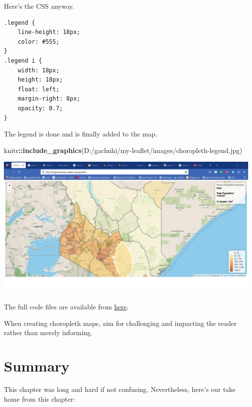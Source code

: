 \documentclass[
]{book}
\newenvironment{Shaded}{\begin{snugshade}}{\end{snugshade}}
\newcommand{\FunctionTok}[1]{\textcolor[rgb]{0.13,0.29,0.53}{\textbf{#1}}}
\newcommand{\NormalTok}[1]{#1}
\newcommand{\SpecialCharTok}[1]{\textcolor[rgb]{0.81,0.36,0.00}{\textbf{#1}}}
\newcommand{\StringTok}[1]{\textcolor[rgb]{0.31,0.60,0.02}{#1}}
\begin{document}
Here's the CSS anyway.

\begin{verbatim}
.legend {
    line-height: 18px;
    color: #555;
}
.legend i {
    width: 18px;
    height: 18px;
    float: left;
    margin-right: 8px;
    opacity: 0.7;
}

\end{verbatim}

The legend is done and is finally added to the map.

\begin{Shaded}
\begin{Highlighting}[]
\NormalTok{knitr}\SpecialCharTok{::}\FunctionTok{include\_graphics}\NormalTok{(}\StringTok{\textquotesingle{}D:/gachuhi/my{-}leaflet/images/choropleth{-}legend.jpg\textquotesingle{}}\NormalTok{)}
\end{Highlighting}
\end{Shaded}

\includegraphics{../images/choropleth-legend.jpg}

The full code files are available from \href{https://github.com/sammigachuhi/my-leaflet-project/tree/main/my-leaflet-code/chapter-7-creating-interactive-choropleth-map}{here}.

When creating choropleth maps, aim for challenging and impacting the reader rather than merely informing.

\hypertarget{summary-6}{%
\section{Summary}\label{summary-6}}

This chapter was long and hard if not confusing. Nevertheless, here's our take home from this chapter:
\end{document}

